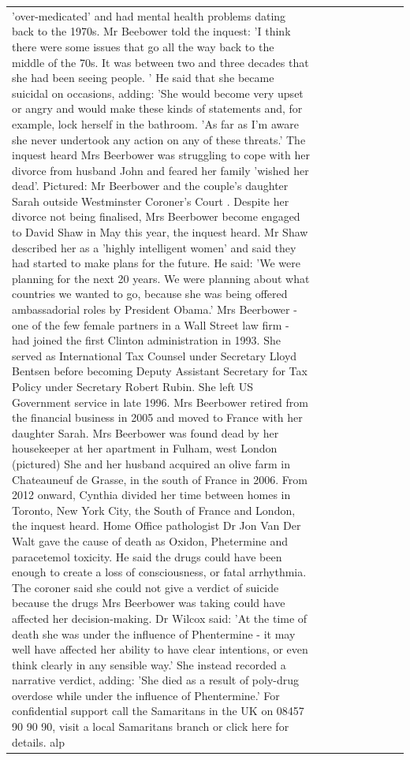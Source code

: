 \begin{table}[H]
\begin{tabular}{lllrlllll}
'over-medicated' and had mental health problems dating back to the 1970s. Mr Beebower told the inquest: 'I think there were some issues that go all the way back to the middle of the 70s. It was between two and three decades that she had been seeing people. ' He said that she became suicidal on occasions, adding: 'She would become very upset or angry and would make these kinds of statements and, for example, lock herself in the bathroom. 'As far as I'm aware she never undertook any action on any of these threats.' The inquest heard Mrs Beerbower was struggling to cope with her divorce from husband John and feared her family 'wished her dead'. Pictured: Mr Beerbower and the couple's daughter Sarah outside Westminster Coroner's Court . Despite her divorce not being finalised, Mrs Beerbower become engaged to David Shaw in May this year, the inquest heard. Mr Shaw described her as a 'highly intelligent women' and said they had started to make plans for the future. He said: 'We were planning for the next 20 years. We were planning about what countries we wanted to go, because she was being offered ambassadorial roles by President Obama.' Mrs Beerbower - one of the few female partners in a Wall Street law firm - had joined the first Clinton administration in 1993. She served as International Tax Counsel under Secretary Lloyd Bentsen before becoming Deputy Assistant Secretary for Tax Policy under Secretary Robert Rubin. She left US Government service in late 1996. Mrs Beerbower retired from the financial business in 2005 and moved to France with her daughter Sarah. Mrs Beerbower was found dead by her housekeeper at her apartment in Fulham, west London (pictured) She and her husband acquired an olive farm in Chateauneuf de Grasse, in the south of France in 2006. From 2012 onward, Cynthia divided her time between homes in Toronto, New York City, the South of France and London, the inquest heard. Home Office pathologist Dr Jon Van Der Walt gave the cause of death as Oxidon, Phetermine and paracetemol toxicity. He said the drugs could have been enough to create a loss of consciousness, or fatal arrhythmia. The coroner said she could not give a verdict of suicide because the drugs Mrs Beerbower was taking could have affected her decision-making. Dr Wilcox said: 'At the time of death she was under the influence of Phentermine - it may well have affected her ability to have clear intentions, or even think clearly in any sensible way.' She instead recorded a narrative verdict, adding: 'She died as a result of poly-drug overdose while under the influence of Phentermine.' For confidential support call the Samaritans in the UK on 08457 90 90 90, visit a local Samaritans branch or click here for details. alp \\

\end{tabular}
\end{table}
